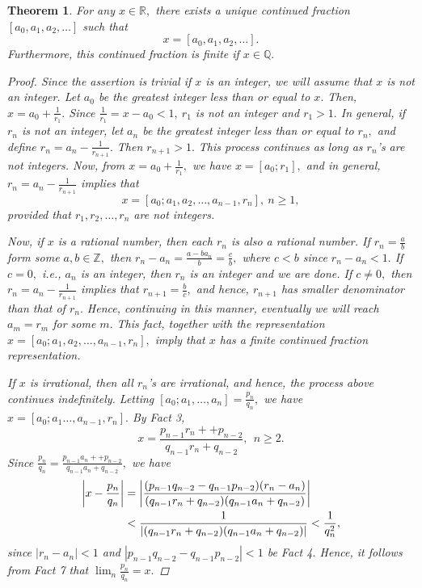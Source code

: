 \documentclass[11pt]{amsart}
\theoremstyle{plain}
\newtheorem{thm}{Theorem}
\theoremstyle{definition}
\begin{document}
\begin{thm}   For any $x\in \mathbb R, $ there exists a unique continued fraction
$[a_0, a_1, a_2, \dots ] $ such that 
$$ x=[a_0, a_1, a_2, \dots ] . $$
Furthermore, this continued fraction is finite if $x\in \mathbb Q. $

\begin{proof}
 Since the assertion is trivial if $x$ is an integer, we will assume that $x$ is not an integer.  Let $a_0 $ be the greatest integer less than or equal to $x. $  Then, $x=a_0 + \frac{1}{r_1}. $  Since $\frac{1}{r_1}=x-a_0 <1, \ r_1 $ is not an integer and $r_1>1. $  In general, if
$r_n $ is not an integer, let $a_n $ be the greatest integer less than or equal to $r_n ,$ and
define $r_{n}=a_n-\frac{1}{r_{n+1}}. $  Then $r_{n+1} >1. $  This process continues as long as $r_n$'s are not integers.  Now, from $x=a_0 + \frac{1}{r_1}, $ we have $x=[a_0; r_1], $ and in general,
$r_{n}=a_n-\frac{1}{r_{n+1}} $ implies that
$$ x=[a_0; a_1, a_2, \dots , a_{n-1}, r_n], \ n\geq 1, $$
provided that $r_1, r_2, \dots , r_n $ are not integers. 

Now, if $x $ is a rational number, then each $r_n $ is also a rational number.  If $r_n=\frac{a}{b} $ form some $a,b \in \mathbb Z, $ then $r_n - a_n =\frac{a-b a_n}{b}=\frac{c}{b}, $ where $c<b $ since
$r_n -a_n <1. $  If $c=0, $ i.e., $a_n $ is an integer, then $r_n $ is an integer and we are done.  
If $c\neq 0, $ then $r_{n}=a_n-\frac{1}{r_{n+1}}$ implies that $r_{n+1}=\frac{b}{c}, $ and hence, $r_{n+1}$ has smaller denominator than that of $r_n. $  Hence, continuing in this manner, eventually we will reach $a_m=r_m $ for some $m. $  This fact, together with the representation
$ x=[a_0; a_1, a_2, \dots , a_{n-1}, r_n], $ imply that $x$ has a finite continued fraction representation.

If $x$ is irrational, then all $r_n$'s are irrational, and hence, the process above continues indefinitely.  Letting $[a_0; a_1, \dots , a_n]=\frac{p_n}{q_n}, $ we have 
$x=[a_0; a_1 \dots, a_{n-1}, r_n]. $  By Fact 3, 
$$ x=\frac{p_{n-1}r_n + +p_{n-2}}{q_{n-1}r_n +q_{n-2}}, \ \ n\geq 2. $$
Since $\frac{p_n}{q_n} =\frac{p_{n-1}a_n + +p_{n-2}}{q_{n-1}a_n +q_{n-2}}, $ we have
$$ \aligned \left | x - \frac{p_n}{q_n} \right | & =
\left |\frac{(p_{n-1}q_{n -2} - q_{n-1} p_{n-2}) (r_n-a_n)}{(q_{n-1}r_n+q_{n-2})(q_{n-1} a_n+q_{n-2})}
\right | \\
& < \frac{1}{|(q_{n-1}r_n+q_{n-2})(q_{n-1} a_n+q_{n-2})|}< \frac{1}{q_n^2}, \endaligned $$
since $|r_n-a_n|<1 $ and $|p_{n-1}q_{n -2} - q_{n-1} p_{n-2}|<1 $ be Fact 4.  Hence, it follows from Fact 7 that
$\lim_n \frac{p_n}{q_n}=x.$


\end{proof}
\end{thm}
\end{document}
